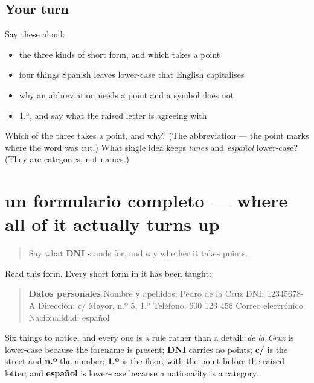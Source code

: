 \subsection*{Your turn}
Say these aloud:

\begin{itemize}
\raggedright
  \item the three kinds of short form, and which takes a point
  \item four things Spanish leaves lower-case that English capitalises
  \item why an abbreviation needs a point and a symbol does not
  \item 1.ª, and say what the raised letter is agreeing with
\end{itemize}

\begin{tcolorbox}[breakable,colback=teal!4,colframe=teal!35!black,title={Before you move on}]
Which of the three takes a point, and why? (The abbreviation — the point marks where the word was cut.) What single idea keeps \emph{lunes} and \emph{español} lower-case? (They are categories, not names.)
\end{tcolorbox}
\section[un formulario completo]{un formulario completo — where all of it actually turns up}

\label{lesson:ES-C426-sintesis-formulario}



\begin{quote}
Say what \textbf{DNI} stands for, and say whether it takes points.
\end{quote}

\begin{tcolorbox}[breakable,skin=enhanced,colback=orange!6,colframe=orange!45!black,boxrule=0.5pt,arc=1mm,left=6pt,right=6pt,top=4pt,bottom=4pt,fonttitle=\bfseries,title={Read this}]
Read this form. Every short form in it has been taught:

\begin{quote}
\textbf{Datos personales} Nombre y apellidos: Pedro de la Cruz DNI: 12345678-A Dirección: c/ Mayor, n.º 5, 1.º Teléfono: 600 123 456 Correo electrónico: Nacionalidad: español
\end{quote}

Six things to notice, and every one is a rule rather than a detail: \emph{de la Cruz} is lower-case because the forename is present; \textbf{DNI} carries no points; \textbf{c/} is the street and \textbf{n.º} the number; \textbf{1.º} is the floor, with the point before the raised letter; and \textbf{español} is lower-case because a nationality is a category.
\end{tcolorbox}


